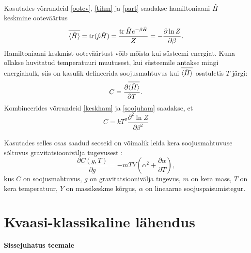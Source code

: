\documentclass{trkut}%
\DeclareMathOperator{\tr}{tr}
\renewcommand\braket[1]{\langle{#1}\rangle}
\begin{document}
Kasutades võrrandeid \eqref{ootev}, \eqref{tihm} ja \eqref{part} saadakse hamiltoniaani $\op{H}$ keskmine ooteväärtus
\begin{equation}
    \overline{\braket{\op{H}}}=\tr(\op{\rho}\op{H})=\frac{\tr{\op{H}e^{-\beta \op{H}}}}{Z}= -\frac{\partial \ln Z}{\partial \beta}.
    \label{keskham}
\end{equation}
Hamiltoniaani keskmist ooteväärtust võib mõista kui süsteemi energiat. Kuna ollakse huvitatud temperatuuri muutusest, kui süsteemile antakse mingi energiahulk, siis on kasulik defineerida soojusmahtuvus kui $\overline{\braket{\op{H}}}$ osatuletis $T$ järgi:
\begin{equation}
    C = \frac{\partial \overline{\braket{\op{H}}}}{\partial T}.
    \label{soojuham}
\end{equation}
Kombineerides võrrandeid \eqref{keskham} ja \eqref{soojuham} saadakse, et
\begin{equation}
    C = k T^2 \frac{\partial^2 \ln Z}{\partial \beta^2}
    \label{mahtuvus}
\end{equation}

Kasutades selles osas saadud seoseid on võimalik leida kera soojusmahtuvuse sõltuvus gravitatsioonivälja tugevusest \parencite[10-13]{palma15}:
\begin{equation} \label{palmasor}
    \frac{\partial C(g,T)}{\partial g} = -mTY \left( \alpha^2 + \frac{\partial \alpha}{\partial T} \right),
\end{equation}
kus \(C\) on soojusmahtuvus, \(g\) on gravitatsioonivälja tugevus, \(m\) on kera mass, \(T\) on kera temperatuur, \(Y\) on massikeskme kõrgus, \(\alpha\) on lineaarne soojuspaisumistegur.


\section{Kvaasi-klassikaline lähendus}

\Huge
\textbf{Sissejuhatus teemale}
\normalsize
\end{document}
